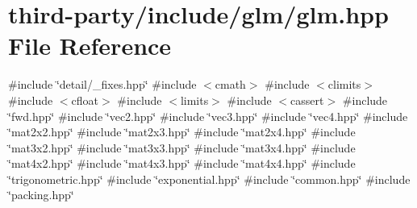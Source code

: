 \hypertarget{third-party_2include_2glm_2glm_8hpp}{}\section{third-\/party/include/glm/glm.hpp File Reference}
\label{third-party_2include_2glm_2glm_8hpp}
{\ttfamily \#include \char`\"{}detail/\+\_\+fixes.\+hpp\char`\"{}}\newline
{\ttfamily \#include $<$cmath$>$}\newline
{\ttfamily \#include $<$climits$>$}\newline
{\ttfamily \#include $<$cfloat$>$}\newline
{\ttfamily \#include $<$limits$>$}\newline
{\ttfamily \#include $<$cassert$>$}\newline
{\ttfamily \#include \char`\"{}fwd.\+hpp\char`\"{}}\newline
{\ttfamily \#include \char`\"{}vec2.\+hpp\char`\"{}}\newline
{\ttfamily \#include \char`\"{}vec3.\+hpp\char`\"{}}\newline
{\ttfamily \#include \char`\"{}vec4.\+hpp\char`\"{}}\newline
{\ttfamily \#include \char`\"{}mat2x2.\+hpp\char`\"{}}\newline
{\ttfamily \#include \char`\"{}mat2x3.\+hpp\char`\"{}}\newline
{\ttfamily \#include \char`\"{}mat2x4.\+hpp\char`\"{}}\newline
{\ttfamily \#include \char`\"{}mat3x2.\+hpp\char`\"{}}\newline
{\ttfamily \#include \char`\"{}mat3x3.\+hpp\char`\"{}}\newline
{\ttfamily \#include \char`\"{}mat3x4.\+hpp\char`\"{}}\newline
{\ttfamily \#include \char`\"{}mat4x2.\+hpp\char`\"{}}\newline
{\ttfamily \#include \char`\"{}mat4x3.\+hpp\char`\"{}}\newline
{\ttfamily \#include \char`\"{}mat4x4.\+hpp\char`\"{}}\newline
{\ttfamily \#include \char`\"{}trigonometric.\+hpp\char`\"{}}\newline
{\ttfamily \#include \char`\"{}exponential.\+hpp\char`\"{}}\newline
{\ttfamily \#include \char`\"{}common.\+hpp\char`\"{}}\newline
{\ttfamily \#include \char`\"{}packing.\+hpp\char`\"{}}\newline
